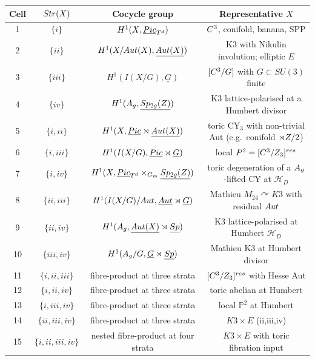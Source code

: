 \begin{center}
\begin{tabular}{|c|c|c|c|}
\hline
Cell & $Str(X)$ & Cocycle group & Representative $X$ \\
\hline
1 & $\{i\}$ & $H^{1}(X,\underline{Pic}_{T^{d}})$ & $C^{3}$, conifold, banana, SPP \\
2 & $\{ii\}$ & $H^{1}(X/Aut(X),\underline{Aut(X)})$ & K3 with Nikulin involution; elliptic $E$ \\
3 & $\{iii\}$ & $H^{1}(I(X/G),\underline{G})$ & $[C^{3}/G]$ with $G\subset SU(3)$ finite \\
4 & $\{iv\}$ & $H^{1}(A_{g},\underline{Sp_{2g}(Z)})$ & K3 lattice-polarised at a Humbert divisor \\
\hline
5 & $\{i,ii\}$ & $H^{1}(X,\underline{Pic}\rtimes\underline{Aut(X)})$ & toric CY$_{3}$ with non-trivial Aut (e.g.\ conifold $\rtimes Z/2$) \\
6 & $\{i,iii\}$ & $H^{1}(I(X/G),\underline{Pic}\rtimes\underline{G})$ & local $P^{2}=[C^{3}/Z_{3}]^{res}$ \\
7 & $\{i,iv\}$ & $H^{1}(X,\underline{Pic}_{T^{d}}\times_{G_{m}}\underline{Sp_{2g}(Z)})$ & toric degeneration of a $A_{g}$-lifted CY at $\mathcal{H}_{D}$ \\
8 & $\{ii,iii\}$ & $H^{1}(I(X/G)/Aut,\underline{Aut}\rtimes\underline{G})$ & Mathieu $M_{24}\curvearrowright K3$ with residual $Aut$ \\
9 & $\{ii,iv\}$ & $H^{1}(A_{g},\underline{Aut(X)}\rtimes\underline{Sp})$ & K3 lattice-polarised at Humbert $\mathcal{H}_{D}$ \\
10 & $\{iii,iv\}$ & $H^{1}(A_{g}/G,\underline{G}\rtimes\underline{Sp})$ & Mathieu K3 at Humbert divisor \\
\hline
11 & $\{i,ii,iii\}$ & fibre-product at three strata & $[C^{3}/Z_{3}]^{res}$ with Hesse Aut \\
12 & $\{i,ii,iv\}$ & fibre-product at three strata & toric abelian at Humbert \\
13 & $\{i,iii,iv\}$ & fibre-product at three strata & local $\mathbb{P}^{2}$ at Humbert \\
14 & $\{ii,iii,iv\}$ & fibre-product at three strata & $K3\times E$ (ii,iii,iv) \\
\hline
15 & $\{i,ii,iii,iv\}$ & nested fibre-product at four strata & $K3\times E$ with toric fibration input \\
\hline
\end{tabular}
\end{center}

